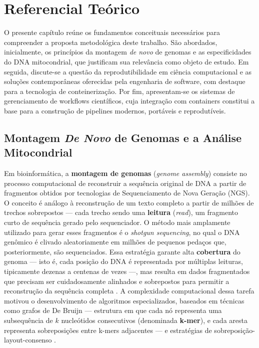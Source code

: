 
\chapter{Referencial Teórico}
\label{cap:referencial}

O presente capítulo reúne os fundamentos conceituais necessários para compreender a proposta metodológica deste trabalho. São abordados, inicialmente, os princípios da montagem \textit{de novo} de genomas e as especificidades do DNA mitocondrial, que justificam sua relevância como objeto de estudo. Em seguida, discute-se a questão da reprodutibilidade em ciência computacional e as soluções contemporâneas oferecidas pela engenharia de software, com destaque para a tecnologia de conteinerização. Por fim, apresentam-se os sistemas de gerenciamento de workflows científicos, cuja integração com containers constitui a base para a construção de pipelines modernos, portáveis e reprodutíveis.

\section{Montagem \textit{De Novo} de Genomas e a Análise Mitocondrial}

Em bioinformática, a \textbf{montagem de genomas} (\textit{genome assembly}) consiste no processo computacional de reconstruir a sequência original de DNA a partir de fragmentos obtidos por tecnologias de Sequenciamento de Nova Geração (NGS). O conceito é análogo à reconstrução de um texto completo a partir de milhões de trechos sobrepostos --- cada trecho sendo uma \textbf{leitura} (\textit{read}), um fragmento curto de sequência gerado pelo sequenciador. O método mais amplamente utilizado para gerar esses fragmentos é o \textit{shotgun sequencing}, no qual o DNA genômico é clivado aleatoriamente em milhões de pequenos pedaços que, posteriormente, são sequenciados. Essa estratégia garante alta \textbf{cobertura} do genoma --- isto é, cada posição do DNA é representada por múltiplas leituras, tipicamente dezenas a centenas de vezes ---, mas resulta em dados fragmentados que precisam ser cuidadosamente alinhados e sobrepostos para permitir a reconstrução da sequência completa \cite{ekblom2014}. A complexidade computacional dessa tarefa motivou o desenvolvimento de algoritmos especializados, baseados em técnicas como grafos de De Bruijn --- estrutura em que cada nó representa uma subsequência de $k$ nucleótidos consecutivos (denominada \textbf{k-mer}), e cada aresta representa sobreposições entre k-mers adjacentes --- e estratégias de sobreposição-layout-consenso \cite{miller2010}.

